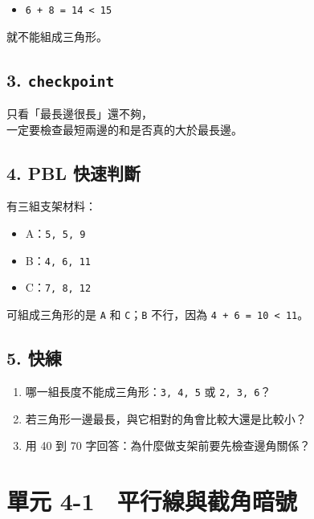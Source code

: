 \documentclass[
  chinese,
  12pt,
  a4paper,
  oneside]{article}
\providecommand{\tightlist}{%
  \setlength{\itemsep}{0pt}\setlength{\parskip}{0pt}}
\begin{document}
\begin{itemize}
\tightlist
\item
  \texttt{6\ +\ 8\ =\ 14\ \textless{}\ 15}
\end{itemize}

就不能組成三角形。

\subsection{\texorpdfstring{3.
\texttt{checkpoint}}{3. checkpoint}}\label{checkpoint-7}

只看「最長邊很長」還不夠，\\
一定要檢查最短兩邊的和是否真的大於最長邊。

\subsection{4. PBL 快速判斷}\label{pbl-ux5febux901fux5224ux65b7-3}

有三組支架材料：

\begin{itemize}
\tightlist
\item
  A：\texttt{5,\ 5,\ 9}
\item
  B：\texttt{4,\ 6,\ 11}
\item
  C：\texttt{7,\ 8,\ 12}
\end{itemize}

可組成三角形的是 \texttt{A} 和 \texttt{C}；\texttt{B} 不行，因為
\texttt{4\ +\ 6\ =\ 10\ \textless{}\ 11}。

\subsection{5. 快練}\label{ux5febux7df4-3}

\begin{enumerate}
\def\labelenumi{\arabic{enumi}.}
\tightlist
\item
  哪一組長度不能成三角形：\texttt{3,\ 4,\ 5} 或 \texttt{2,\ 3,\ 6}？
\item
  若三角形一邊最長，與它相對的角會比較大還是比較小？
\item
  用 40 到 70 字回答：為什麼做支架前要先檢查邊角關係？
\end{enumerate}

\newpage

\section{單元
4-1　平行線與截角暗號}\label{ux55aeux5143-4-1-ux5e73ux884cux7ddaux8207ux622aux89d2ux6697ux865f}
\end{document}
